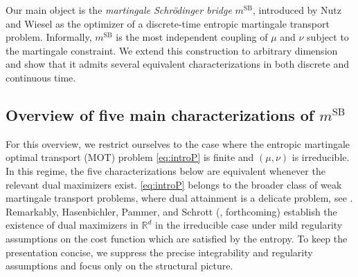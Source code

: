 \documentclass[reqno, a4paper]{amsart}
\newcommand{\msb}{m^{\text{SB}}}
\theoremstyle{plain}
\theoremstyle{definition}
\theoremstyle{remark}
\numberwithin{equation}{section}
\numberwithin{theorem}{section}
\newcommand{\R}{\mathbb{R}}
\begin{document}
	Our main object is the \emph{martingale Schr\"odinger bridge} \(\msb\), introduced by Nutz and Wiesel \cite{NuWi24} as the optimizer of a discrete-time entropic martingale transport problem.  %
    Informally, \(\msb\) is the most independent coupling of \(\mu\) and \(\nu\) subject to the martingale constraint.
	We extend this construction to arbitrary dimension and show that it admits several equivalent characterizations in both discrete and continuous time. 
	
	\subsection{Overview of five main characterizations of \(\msb\)}
	
	
	For this overview, we restrict ourselves to the  case where the entropic martingale optimal transport (MOT) problem \eqref{eq:introP} is finite and $(\mu, \nu)$ is irreducible. %
	In this regime, the five characterizations below are equivalent whenever the relevant dual maximizers exist. \eqref{eq:introP} belongs to the broader class of weak martingale transport problems, where dual attainment is a delicate problem, see \cite{BeNuTo16, BePaRiSc25, CaMaSy25}. Remarkably, Hasenbichler, Pammer, and Schrott  (\cite{HaPaSc26}, forthcoming) establish the existence of dual maximizers in $\R^d$ in the irreducible case  under mild regularity assumptions on the cost function which are satisfied by the entropy. 
	To keep the presentation concise, we suppress the precise integrability and regularity assumptions and focus only on the structural picture.
	
\end{document}
